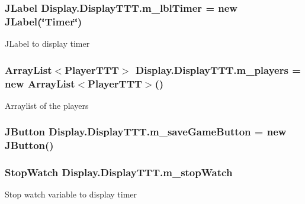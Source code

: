 \subsubsection[{m\+\_\+lbl\+Timer}]{\setlength{\rightskip}{0pt plus 5cm}J\+Label Display.\+Display\+T\+T\+T.\+m\+\_\+lbl\+Timer = new J\+Label(\char`\"{}Timer\char`\"{})\hspace{0.3cm}{\ttfamily [private]}}\label{class_display_1_1_display_t_t_t_a42c7a03ac93841369bd7e73460b59e11}
J\+Label to display timer \hypertarget{class_display_1_1_display_t_t_t_ad3a0687ab98eb4f191cd30a64ef60304}{}
\subsubsection[{m\+\_\+players}]{\setlength{\rightskip}{0pt plus 5cm}Array\+List$<${\bf Player\+T\+T\+T}$>$ Display.\+Display\+T\+T\+T.\+m\+\_\+players = new Array\+List$<${\bf Player\+T\+T\+T}$>$()\hspace{0.3cm}{\ttfamily [private]}}\label{class_display_1_1_display_t_t_t_ad3a0687ab98eb4f191cd30a64ef60304}
Arraylist of the players \hypertarget{class_display_1_1_display_t_t_t_afbd113d4a9cd8573238108344561f62c}{}
\subsubsection[{m\+\_\+save\+Game\+Button}]{\setlength{\rightskip}{0pt plus 5cm}J\+Button Display.\+Display\+T\+T\+T.\+m\+\_\+save\+Game\+Button = new J\+Button()\hspace{0.3cm}{\ttfamily [private]}}\label{class_display_1_1_display_t_t_t_afbd113d4a9cd8573238108344561f62c}
\hypertarget{class_display_1_1_display_t_t_t_ab640a3b08cb9f98d5a9481e45653b49f}{}
\subsubsection[{m\+\_\+stop\+Watch}]{\setlength{\rightskip}{0pt plus 5cm}Stop\+Watch Display.\+Display\+T\+T\+T.\+m\+\_\+stop\+Watch\hspace{0.3cm}{\ttfamily [private]}}\label{class_display_1_1_display_t_t_t_ab640a3b08cb9f98d5a9481e45653b49f}
Stop watch variable to display timer \hypertarget{class_display_1_1_display_t_t_t_a92b6a913aec2926f4fdf565a4146bb31}{}
